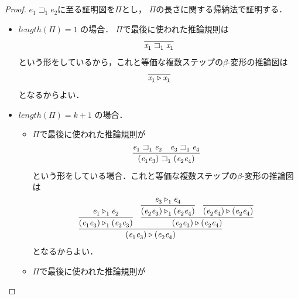\documentclass{ltjsbook}%
\begin{document}
\begin{proof}%
  $\mathit{e}_1^{}\sqsupset_1^{}\mathit{e}_2^{}$に至る証明図を$\Pi$とし，%
  $\Pi$の長さに関する帰納法で証明する．%
  \begin{itemize}%
  \item $length(\Pi)=1$ の場合．%
    $\Pi$で最後に使われた推論規則は%
    \begin{equation}%
      \infer{%
        \mathit{x}_1^{}\sqsupset_1^{}\mathit{x}_1^{}%
      }{%
      }%
    \end{equation}%
    という形をしているから，これと等価な複数ステップの$\beta$-変形の推論図は%
    \begin{equation}%
      \infer{%
        \mathit{x}_1^{}\triangleright\mathit{x}_1^{}%
      }{%
      }%
    \end{equation}%
    となるからよい．%
  \item $length(\Pi)=k + 1$ の場合．%
    \begin{itemize}%
    \item$\Pi$で最後に使われた推論規則が%
    \begin{equation}%
      \infer{%
        (\mathit{e}_1^{}\mathit{e}_3^{})\sqsupset_1^{}(\mathit{e}_2^{}\mathit{e}_4^{})%
      }{%
        \mathit{e}_1^{}\sqsupset_1^{}\mathit{e}_2^{}%
      &%
        \mathit{e}_3^{}\sqsupset_1^{}\mathit{e}_4^{}%
      }%
    \end{equation}%
    という形をしている場合．これと等価な複数ステップの$\beta$-変形の推論図は%
    \begin{equation}%
      \infer{%
        (\mathit{e}_1^{}\mathit{e}_3^{})\triangleright(\mathit{e}_2^{}\mathit{e}_4^{})%
      }{%
        \infer{%
          (\mathit{e}_1^{}\mathit{e}_3^{})\triangleright_1^{}(\mathit{e}_2^{}\mathit{e}_3^{})%
        }{%
          \mathit{e}_1^{}\triangleright_1^{}\mathit{e}_2^{}%
        }%
      &%
        \infer{%
          (\mathit{e}_2^{}\mathit{e}_3^{})\triangleright(\mathit{e}_2^{}\mathit{e}_4^{})%
        }{%
          \infer{%
            (\mathit{e}_2^{}\mathit{e}_3^{})\triangleright_1^{}(\mathit{e}_2^{}\mathit{e}_4^{})%
          }{%
            \mathit{e}_3^{}\triangleright_1^{}\mathit{e}_4^{}%
          }%
        &%
          \infer{%
            (\mathit{e}_2^{}\mathit{e}_4^{})\triangleright(\mathit{e}_2^{}\mathit{e}_4^{})%
          }{}%
        }%
      }%
    \end{equation}%
    となるからよい．%
    \item$\Pi$で最後に使われた推論規則が%
    \begin{equation}%

\end{equation}
\end{itemize}
\end{itemize}
\end{proof}
\end{document}
